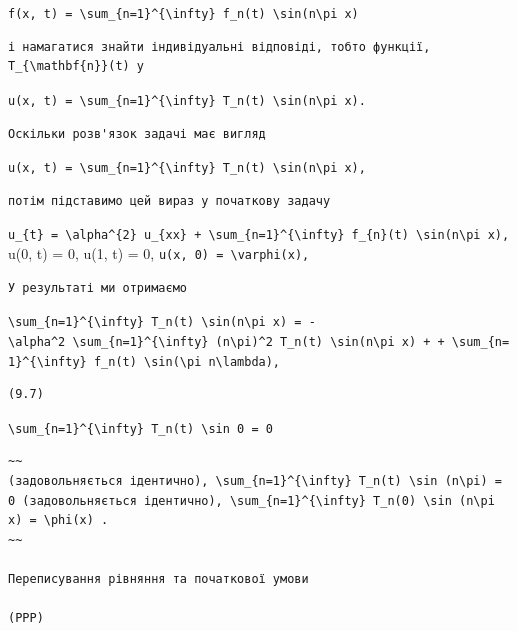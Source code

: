 \documentclass[
  ukrainian,
]{article}
\begin{document}
\texttt{f(x,\ t)\ =\ \textbackslash{}sum\_\{n=1\}\^{}\{\textbackslash{}infty\}\ f\_n(t)\ \textbackslash{}sin(n\textbackslash{}pi\ x)}

\begin{verbatim}
і намагатися знайти індивідуальні відповіді, тобто функції, T_{\mathbf{n}}(t) у
\end{verbatim}

\texttt{u(x,\ t)\ =\ \textbackslash{}sum\_\{n=1\}\^{}\{\textbackslash{}infty\}\ T\_n(t)\ \textbackslash{}sin(n\textbackslash{}pi\ x).}

\begin{verbatim}
Оскільки розв'язок задачі має вигляд
\end{verbatim}

\texttt{u(x,\ t)\ =\ \textbackslash{}sum\_\{n=1\}\^{}\{\textbackslash{}infty\}\ T\_n(t)\ \textbackslash{}sin(n\textbackslash{}pi\ x),}

\begin{verbatim}
потім підставимо цей вираз у початкову задачу
\end{verbatim}

\texttt{u\_\{t\}\ =\ \textbackslash{}alpha\^{}\{2\}\ u\_\{xx\}\ +\ \textbackslash{}sum\_\{n=1\}\^{}\{\textbackslash{}infty\}\ f\_\{n\}(t)\ \textbackslash{}sin(n\textbackslash{}pi\ x),}
u(0, t) = 0, u(1, t) = 0,
\texttt{u(x,\ 0)\ =\ \textbackslash{}varphi(x),}

\begin{verbatim}
У результаті ми отримаємо
\end{verbatim}

\texttt{\textbackslash{}sum\_\{n=1\}\^{}\{\textbackslash{}infty\}\ T\textquotesingle{}\_n(t)\ \textbackslash{}sin(n\textbackslash{}pi\ x)\ =\ -\textbackslash{}alpha\^{}2\ \textbackslash{}sum\_\{n=1\}\^{}\{\textbackslash{}infty\}\ (n\textbackslash{}pi)\^{}2\ T\_n(t)\ \textbackslash{}sin(n\textbackslash{}pi\ x)\ +\ +\ \textbackslash{}sum\_\{n=1\}\^{}\{\textbackslash{}infty\}\ f\_n(t)\ \textbackslash{}sin(\textbackslash{}pi\ n\textbackslash{}lambda),}

\begin{verbatim}
(9.7)
\end{verbatim}

\texttt{\textbackslash{}sum\_\{n=1\}\^{}\{\textbackslash{}infty\}\ T\_n(t)\ \textbackslash{}sin\ 0\ =\ 0}

\begin{verbatim}
~~
(задовольняється ідентично), \sum_{n=1}^{\infty} T_n(t) \sin (n\pi) = 0 (задовольняється ідентично), \sum_{n=1}^{\infty} T_n(0) \sin (n\pi x) = \phi(x) .
~~

Переписування рівняння та початкової умови

(PPP)
\end{verbatim}
\end{document}
